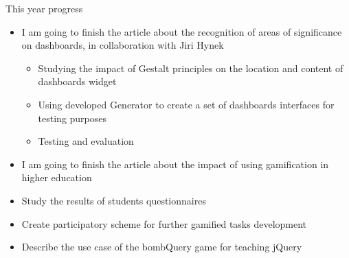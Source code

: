 \documentclass[10pt,xcolor=pdflatex]{beamer}
\begin{document}
\begin{frame}
       \item This year progress
       \begin{itemize}
           \item I am going to finish the article about the recognition of areas of significance on dashboards, in collaboration with Jiri Hynek
               \begin{itemize}
                   \item Studying the impact of Gestalt principles on the location and content of dashboards widget
                   \item Using developed Generator to create a set of dashboards interfaces for testing purposes
                   \item Testing and evaluation
               \end{itemize}
           \item I am going to finish the article about the impact of using gamification in higher education
           \item Study the results of students questionnaires
           \item Create participatory scheme for further gamified tasks development
           \item Describe the use case of the bombQuery game for teaching jQuery 
       \end{itemize}
\end{frame}


\end{document}
